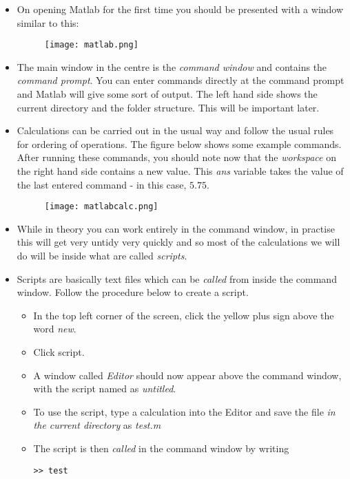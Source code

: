 \documentclass[12pt]{report}
\begin{document}
\begin{itemize}
\item On opening Matlab for the first time you should be presented with a window similar to this:
\begin{figure}[h]		
	\centering
	\texttt{[image: matlab.png]} 
    \caption*{}
\end{figure}
\item The main window in the centre is the \textit{command window} and contains the \textit{command prompt}. You can enter commands directly at the command prompt and Matlab will give some sort of output. The left hand side shows the current directory and the folder structure. This will be important later.
\item Calculations can be carried out in the usual way and follow the usual rules for ordering of operations. The figure below shows some example commands. After running these commands, you should note now that the \textit{workspace} on the right hand side contains a new value. This \textit{ans} variable takes the value of the last entered command - in this case, $5.75$.
\begin{figure}[h]		
	\centering
	\texttt{[image: matlabcalc.png]} 
    \caption*{}
\end{figure}
\item While in theory you can work entirely in the command window, in practise this will get very untidy very quickly and so most of the calculations we will do will be inside what are called \textit{scripts}.
\item Scripts are basically text files which can be \textit{called} from inside the command window. Follow the procedure below to create a script.
\begin{itemize}
\item In the top left corner of the screen, click the yellow plus sign above the word \textit{new}.
\item Click script.
\item A window called \textit{Editor} should now appear above the command window, with the script named as \textit{untitled}.
\item To use the script, type a calculation into the Editor and save the file \textit{in the current directory} as \textit{test.m}
\item The script is then \textit{called} in the command window by writing 
\begin{lstlisting}
>> test
\end{lstlisting} 

\end{itemize}
\end{itemize}
\end{document}
